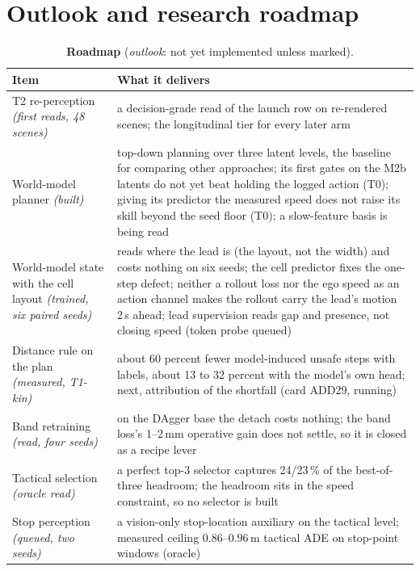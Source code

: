 \documentclass[10pt,twocolumn]{article}
\theoremstyle{remark}
\newcommand{\tier}[1]{\textsc{\small #1}}
\begin{document}
\section{Outlook and research roadmap}\label{sec:outlook}
\begin{table}[!t]
\centering
\caption{\textbf{Roadmap} (\emph{outlook}: not yet implemented unless marked).}
\label{tab:roadmap}
\footnotesize
\begin{tabularx}{\columnwidth}{@{}>{\raggedright\arraybackslash}p{24mm}>{\raggedright\arraybackslash}X@{}}
\toprule
Item & What it delivers \\
\midrule
T2 re-perception \textit{(first reads, 48 scenes)} & a decision-grade read of the launch row on re-rendered scenes; the longitudinal tier for every later arm \\
World-model planner \textit{(built)} & top-down planning over three latent levels, the baseline for comparing other approaches; its first gates on the M2b latents do not yet beat holding the logged action (\tier{T0}); giving its predictor the measured speed does not raise its skill beyond the seed floor (\tier{T0}); a slow-feature basis is being read \\
World-model state with the cell layout \textit{(trained, six paired seeds)} & reads where the lead is (the layout, not the width) and costs nothing on six seeds; the cell predictor fixes the one-step defect; neither a rollout loss nor the ego speed as an action channel makes the rollout carry the lead's motion 2\,s ahead; lead supervision reads gap and presence, not closing speed (token probe queued) \\
Distance rule on the plan \textit{(measured, T1-kin)} & about 60 percent fewer model-induced unsafe steps with labels, about 13 to 32 percent with the model's own head; next, attribution of the shortfall (card ADD29, running) \\
Band retraining \textit{(read, four seeds)} & on the DAgger base the detach costs nothing; the band loss's 1--2\,mm operative gain does not settle, so it is closed as a recipe lever \\
Tactical selection \textit{(oracle read)} & a perfect top-3 selector captures 24/23\,\% of the best-of-three headroom; the headroom sits in the speed constraint, so no selector is built \\
Stop perception \textit{(queued, two seeds)} & a vision-only stop-location auxiliary on the tactical level; measured ceiling 0.86--0.96\,m tactical ADE on stop-point windows (oracle) \\

\end{tabularx}
\end{table}
\end{document}

